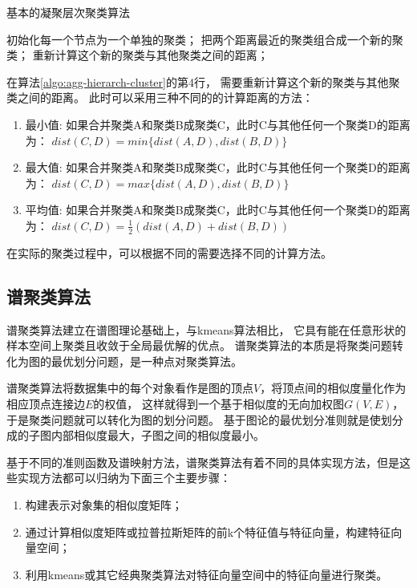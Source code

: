 \begin{algorithm}[htb]
    \caption{基本的凝聚层次聚类算法}
    \label{algo:agg-hierarch-cluster}
    \begin{algorithmic}[1]
        \State 初始化每一个节点为一个单独的聚类；
        \Repeat
            \State 把两个距离最近的聚类组合成一个新的聚类；
            \State 重新计算这个新的聚类与其他聚类之间的距离；
    \end{algorithmic}
\end{algorithm}

在算法\ref{algo:agg-hierarch-cluster}的第4行，
需要重新计算这个新的聚类与其他聚类之间的距离。
此时可以采用三种不同的的计算距离的方法：

\begin{enumerate}
    \item 最小值: 如果合并聚类A和聚类B成聚类C，此时C与其他任何一个聚类D的距离为：
        $dist(C, D) = min\{dist(A, D), dist(B, D)\}$
    \item 最大值: 如果合并聚类A和聚类B成聚类C，此时C与其他任何一个聚类D的距离为：
        $dist(C, D) = max\{dist(A, D), dist(B, D)\}$
    \item 平均值: 如果合并聚类A和聚类B成聚类C，此时C与其他任何一个聚类D的距离为：
        $dist(C, D) = \frac{1}{2}(dist(A, D) + dist(B, D))$
\end{enumerate}

在实际的聚类过程中，可以根据不同的需要选择不同的计算方法。

\subsection{谱聚类算法}

谱聚类算法建立在谱图理论基础上，与kmeans算法相比，
它具有能在任意形状的样本空间上聚类且收敛于全局最优解的优点。
谱聚类算法的本质是将聚类问题转化为图的最优划分问题，是一种点对聚类算法。

谱聚类算法将数据集中的每个对象看作是图的顶点$V$，将顶点间的相似度量化作为相应顶点连接边$E$的权值，
这样就得到一个基于相似度的无向加权图$G(V, E)$，于是聚类问题就可以转化为图的划分问题。
基于图论的最优划分准则就是使划分成的子图内部相似度最大，子图之间的相似度最小。

基于不同的准则函数及谱映射方法，谱聚类算法有着不同的具体实现方法，但是这些实现方法都可以归纳为下面三个主要步骤：

\begin{enumerate}
    \item 构建表示对象集的相似度矩阵；
    \item 通过计算相似度矩阵或拉普拉斯矩阵的前k个特征值与特征向量，构建特征向量空间；
    \item 利用kmeans或其它经典聚类算法对特征向量空间中的特征向量进行聚类。
\end{enumerate}

